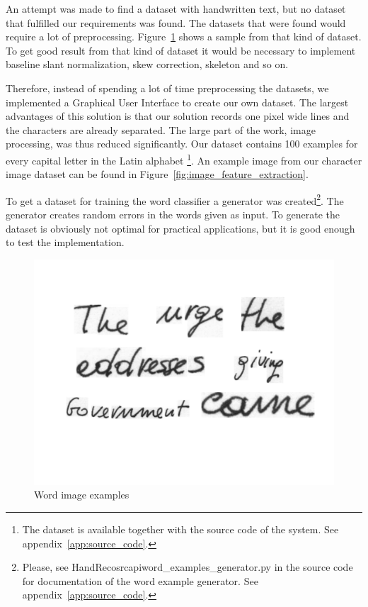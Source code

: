 
An attempt was made to find a dataset with handwritten text, but no dataset that fulfilled our requirements was found.
The datasets that were found would require a lot of preprocessing. 
Figure~\ref{figure:wordsexamples} shows a sample from that kind of dataset.
To get good result from that kind of dataset it would be necessary to implement baseline slant normalization, skew correction, skeleton and so on.

Therefore, instead of spending a lot of time preprocessing the datasets, we implemented a Graphical User Interface to create our own dataset.
The largest advantages of this solution is that our solution records one pixel wide lines and the characters are already separated. 
The large part of the work, image processing, was thus reduced significantly.
Our dataset contains 100 examples for every capital letter in the Latin alphabet
\footnote{The dataset is available together with the source code of the system. See appendix~\ref{app:source_code}.}.
An example image from our character image dataset can be found in Figure~\ref{fig:image_feature_extraction}.

To get a dataset for training the word classifier a generator was created\footnote{Please, see HandReco\/src\/api\/word\_examples\_generator.py in the source code for documentation of the word example generator. See appendix~\ref{app:source_code}.}.
The generator creates random errors in the words given as input.
To generate the dataset is obviously not optimal for practical applications, but it is good enough to test the implementation.

\begin{figure}[h!]
\centering
 \includegraphics[width=5in]{datasets_examples}
\caption{Word image examples}
\label{figure:wordsexamples}
\end{figure}